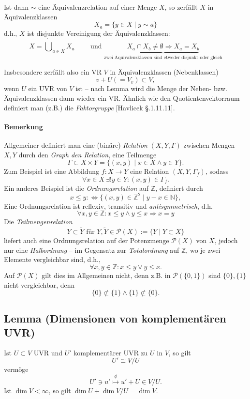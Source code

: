 	Ist dann $ \sim $ eine Äquivalenzrelation auf einer Menge $ X $, so zerfällt $ X $ in Äquivalenzklassen
		\[ X_a = \{y\in X\mid y\sim a\} \]
	d.h., $ X $ ist disjunkte Vereinigung der Äquivalenzklassen:
		\[ X = \dot{\bigcup}_{a\in X}X_a \qquad\text{ und } \underbrace{X_a \cap X_b \neq \emptyset \Rightarrow X_a = X_b}_{\text{zwei Äquivalenzklassen sind etweder disjunkt oder gleich}} \]
		
	Insbesondere zerfällt also ein VR $ V $ in Äquivalenzklassen (Nebenklassen)
		\[ v+U (= V_v)\subset V, \]
	wenn $ U $ ein UVR von $ V $ ist -- nach Lemma wird die Menge der Neben- bzw. Äquivalenzklassen dann wieder ein VR. Ähnlich wie den Quotientenvektorraum definiert man (z.B.) die \emph{Faktorgruppe} [Havlicek §.1.11.11].
	
\paragraph{Bemerkung}
	Allgemeiner definiert man eine (binäre) \emph{Relation} $ (X,Y,\Gamma) $ zwischen Mengen $ X, Y $ durch den \emph{Graph den Relation}, eine Teilmenge
		\[ \Gamma \subset X\times Y = \{(x,y)\mid x\in X \land y\in Y\}. \]
	Zum Beispiel ist eine Abbildung $ f:X\to Y $ eine Relation $ (X,Y,\Gamma_f) $, sodass
		\[ \forall x\in X\ \exists ! y\in Y:(x,y)\in \Gamma_f. \]
	Ein anderes Beispiel ist die \emph{Ordnungsrelation} auf $ \mathbb{Z} $, definiert durch
		\[ x\leq y :\Leftrightarrow \{(x,y)\in \mathbb{Z}^2\mid y-x\in \mathbb{N}\}, \]
	Eine Ordnungsrelation ist reflexiv, transitiv und \emph{antisymmetrisch}, d.h.
	\[\forall x,y\in \mathbb{Z}: x\leq y\land y\leq x\Rightarrow x=y \]
	Die \emph{Teilmengenrelation}
		\[ Y\subset\tilde{Y} \text{ für } Y,\tilde{Y}\in \mathcal{P}(X):= \{Y\mid Y\subset X\} \]
	liefert auch eine Ordnungsrelation auf der Potenzmenge $ \mathcal{P}(X) $ von $ X $, jedoch nur eine \emph{Halbordnung} -- im Gegensatz zur \emph{Totalordnung} auf $ \mathbb{Z} $, wo je zwei Elemente vergleichbar sind, d.h.,
		\[ \forall x,y\in \mathbb{Z}: x\leq y\lor y\leq x. \]
	Auf $ \mathcal{P}(X) $ gilt dies im Allgemeinen nicht, denn z.B. in $ \mathcal{P}(\{0,1\}) $ sind $ \{0\},\{1\} $ nicht vergleichbar, denn
		\[ \{0\}\not\subset\{1\}\land \{1\}\not\subset \{0\}. \]

\subsection{Lemma (Dimensionen von komplementären UVR)}
	\begin{Lemma}
		Ist $ U\subset V $ UVR und $ U' $ komplementärer UVR zu $ U $ in $ V $, so gilt
		\[ U'\cong V/U \]
	vermöge
		\[ U'\ni u' \overset{\phi}{\mapsto} u'+U\in V/U. \]
	Ist $ \dim V<\infty $, so gilt $ \dim U+\dim V/U = \dim V $.
	\end{Lemma}
	
